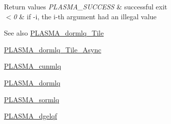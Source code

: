 \begin{DoxyRetVals}{Return values}
{\em P\+L\+A\+S\+M\+A\+\_\+\+S\+U\+C\+C\+E\+S\+S} & successful exit \\
\hline
{\em $<$0} & if -\/i, the i-\/th argument had an illegal value\\
\hline
\end{DoxyRetVals}
\begin{DoxySeeAlso}{See also}
\hyperlink{group__double__Tile_gadab91637fe96b50a3053a5ff5b334b2f_gadab91637fe96b50a3053a5ff5b334b2f}{P\+L\+A\+S\+M\+A\+\_\+dormlq\+\_\+\+Tile} 

\hyperlink{group__double__Tile__Async_gab1421be17b653db9ff4aa7be056bdbfc_gab1421be17b653db9ff4aa7be056bdbfc}{P\+L\+A\+S\+M\+A\+\_\+dormlq\+\_\+\+Tile\+\_\+\+Async} 

\hyperlink{group__PLASMA__Complex32__t_gac9aca2d8444a6e5630fe4674505a2afd_gac9aca2d8444a6e5630fe4674505a2afd}{P\+L\+A\+S\+M\+A\+\_\+cunmlq} 

\hyperlink{group__double_ga7c70d5b53e69f9ab564126c78938002a_ga7c70d5b53e69f9ab564126c78938002a}{P\+L\+A\+S\+M\+A\+\_\+dormlq} 

\hyperlink{group__float_ga4f42eb41e34bdf290b36fe5ce8e576b7_ga4f42eb41e34bdf290b36fe5ce8e576b7}{P\+L\+A\+S\+M\+A\+\_\+sormlq} 

\hyperlink{group__double_ga60fffe07485af5c38c0447efccf8ccfe_ga60fffe07485af5c38c0447efccf8ccfe}{P\+L\+A\+S\+M\+A\+\_\+dgelqf} 
\end{DoxySeeAlso}
\hypertarget{group__double_ga9623493d89eb656c0f5aa44c7772294c_ga9623493d89eb656c0f5aa44c7772294c}{}
